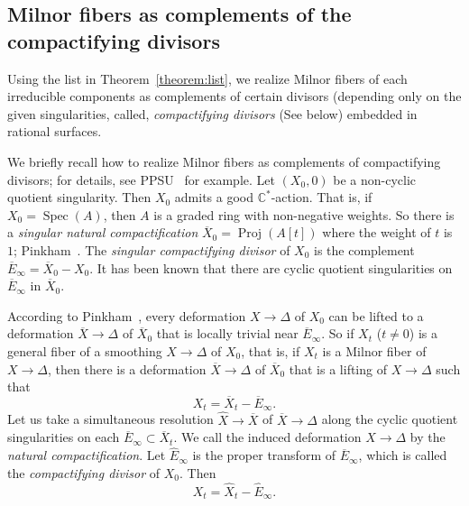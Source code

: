 \documentclass[reqno, twoside, a4paper]{amsart}
\theoremstyle{definition}
\numberwithin{equation}{section}
\DeclareMathOperator{\Spec}{Spec}
\DeclareMathOperator{\Proj}{Proj}
\begin{document}
\subsection{Milnor fibers as complements of the compactifying divisors}

Using the list in Theorem~\ref{theorem:list}, we realize Milnor fibers of each irreducible components as complements of certain divisors (depending only on the given singularities, called, \emph{compactifying divisors} (See below) embedded in rational surfaces.

We briefly recall how to realize Milnor fibers as complements of compactifying divisors; for details, see PPSU~\cite{PPSU-2015} for example. Let $(X_0,0)$ be a non-cyclic quotient singularity. Then $X_0$ admits a good $\mathbb{C}^{\ast}$-action. That is, if $X_0=\Spec(A)$, then $A$ is a graded ring with non-negative weights. So there is a \emph{singular natural compactification} $\overline{X}_0 = \Proj(A[t])$ where the weight of $t$ is $1$; Pinkham~\cite{Pinkham-1977}. The \emph{singular compactifying divisor} of $X_0$ is the complement $\overline{E}_{\infty}=\overline{X}_0-X_0$. It has been known that there are cyclic quotient singularities on $\overline{E}_{\infty}$ in $\overline{X}_0$.

According to Pinkham~\cite{Pinkham-1977}, every deformation $X \to \Delta$ of $X_0$ can be lifted to a deformation $\overline{X} \to \Delta$ of $\overline{X}_0$ that is locally trivial near $\overline{E}_{\infty}$. So if $X_t$ ($t \neq 0$) is a general fiber of a smoothing $X \to \Delta$ of $X_0$, that is, if $X_t$ is a Milnor fiber of $X \to \Delta$, then there is a deformation $\overline{X} \to \Delta$ of $\overline{X}_0$ that is a lifting of $X \to \Delta$ such that
%
\begin{equation*}
X_t = \overline{X}_t - \overline{E}_{\infty}.
\end{equation*}
%
Let us take a simultaneous resolution $\widehat{X} \to \overline{X}$ of $\overline{X} \to \Delta$ along the cyclic quotient singularities on each $\overline{E}_{\infty} \subset \overline{X}_t$. We call the induced deformation $\widehat{X} \to \Delta$ by the \emph{natural compactification}. Let $\widehat{E}_{\infty}$ is the proper transform of $\overline{E}_{\infty}$, which is called the \emph{compactifying divisor} of $X_0$. Then
%
\begin{equation*}
X_t = \widehat{X}_t - \widehat{E}_{\infty}.
\end{equation*}
\end{document}
